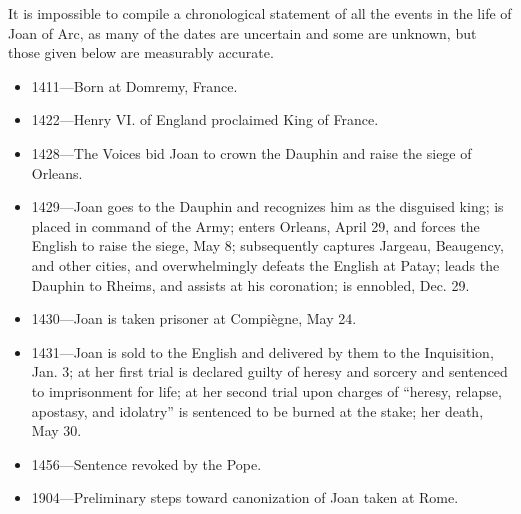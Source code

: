 
\drop It is impossible to compile a chronological statement of all the events
in the life of Joan of Arc, as many of the dates are uncertain and some
are unknown, but those given below are measurably accurate.

\begin{itemize}

\item 1411---Born at Domremy, France.

\item 1422---Henry VI. of England proclaimed King of France.

\item 1428---The Voices bid Joan to crown the Dauphin and raise the siege
of Orleans.

\item 1429---Joan goes to the Dauphin and recognizes him as the disguised
king; is placed in command of the Army; enters Orleans,
April 29, and forces the English to raise the siege, May 8;
subsequently captures Jargeau, Beaugency, and other cities,
and overwhelmingly defeats the English at Patay; leads the
Dauphin to Rheims, and assists at his coronation;
is ennobled, Dec. 29.

\item 1430---Joan is taken prisoner at Compiègne, May 24.

\item 1431---Joan is sold to the English and delivered by them to the
Inquisition, Jan. 3; at her first trial is declared guilty
of heresy and sorcery and sentenced to imprisonment for
life; at her second trial upon charges of “heresy, relapse,
apostasy, and idolatry” is sentenced to be burned at the
stake; her death, May 30.

\item 1456---Sentence revoked by the Pope.

\item 1904---Preliminary steps toward canonization of Joan taken at Rome.
 
\end{itemize}

\threeast
